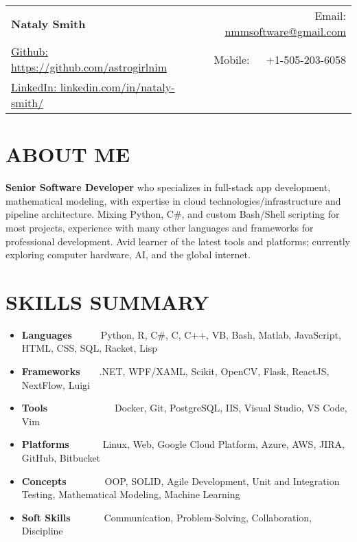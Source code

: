 \documentclass[a4paper,20pt]{article}
\newcommand{\resumeItem}[2]{
  \item\small{
    \textbf{#1}{#2 \vspace{-3pt}}
  }
}
\newcommand{\resumeSubItem}[2]{\resumeItem{#1}{#2}\vspace{-5pt}}
\newcommand{\resumeSubHeadingListStart}{\begin{itemize}[leftmargin=*]}
\newcommand{\resumeSubHeadingListEnd}{\end{itemize}}
\begin{document}
\begin{tabular*}{\textwidth}{l@{\extracolsep{\fill}}r}
  \textbf{{\LARGE Nataly Smith}} & Email: \href{mailto:}{nmmsoftware@gmail.com}\\
  \href{https://github.com/astrogirlnim}{Github: https://github.com/astrogirlnim} & Mobile:~~~+1-505-203-6058 \\
  \href{https://www.linkedin.com/in/nataly-smith/}{LinkedIn: linkedin.com/in/nataly-smith/} \\
\end{tabular*}

\vspace{2pt}
\section{\textbf{ABOUT ME}}
\textbf{Senior Software Developer} who specializes in full-stack app development, mathematical modeling, with expertise in cloud technologies/infrastructure and pipeline architecture. Mixing Python, C\#, and custom Bash/Shell scripting for most projects, experience with many other languages and frameworks for professional development. Avid learner of the latest tools and platforms; currently exploring computer hardware, AI, and the global internet.
\vspace{6pt}
\section{\textbf{SKILLS SUMMARY}}
	\resumeSubHeadingListStart
	\resumeSubItem{Languages}{~~~~~~Python, R, C\#, C, C++, VB, Bash, Matlab, JavaScript, HTML, CSS, SQL, Racket, Lisp}
	\resumeSubItem{Frameworks}{~~~~.NET, WPF/XAML, Scikit, OpenCV, Flask, ReactJS, NextFlow, Luigi}
	\resumeSubItem{Tools}{~~~~~~~~~~~~~~Docker, Git, PostgreSQL, IIS, Visual Studio, VS Code, Vim}
	\resumeSubItem{Platforms}{~~~~~~~Linux, Web, Google Cloud Platform, Azure, AWS, JIRA,  GitHub, Bitbucket}
    \resumeSubItem{Concepts}{~~~~~~~~OOP, SOLID, Agile Development, Unit and Integration Testing, Mathematical Modeling, Machine Learning}
	\resumeSubItem{Soft Skills}{~~~~~~~Communication, Problem-Solving, Collaboration, Discipline}

\resumeSubHeadingListEnd
\vspace{6pt}
\end{document}
